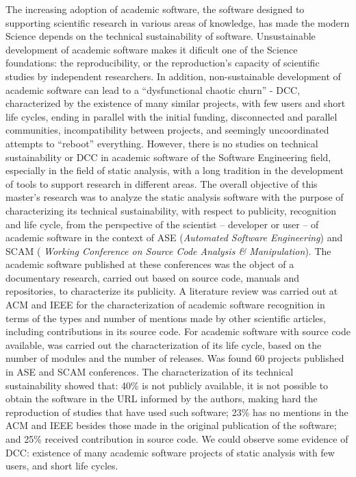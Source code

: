 The increasing adoption of academic software, the software designed to
supporting scientific research in various areas of knowledge, has made the
modern Science depends on the technical sustainability of software.
%
Unsustainable development of academic software makes it dificult one of the
Science foundations: the reproducibility, or the reproduction's capacity of
scientific studies by independent researchers.
%
In addition, non-sustainable development of academic software can lead to a
``dysfunctional chaotic churn'' - DCC, characterized by the existence of many
similar projects, with few users and short life cycles, ending in parallel with
the initial funding, disconnected and parallel communities, incompatibility
between projects, and seemingly uncoordinated attempts to ``reboot''
everything.
%
However, there is no studies on technical sustainability or DCC in academic
software of the Software Engineering field, especially in the field of static
analysis, with a long tradition in the development of tools to support research
in different areas.
%
The overall objective of this master's research was to analyze the static
analysis software with the purpose of characterizing its technical
sustainability, with respect to publicity, recognition and life cycle, from the
perspective of the scientist -- developer or user -- of academic software in
the context of ASE ({\it Automated Software Engineering}) and SCAM ({\it
Working Conference on Source Code Analysis \& Manipulation}).
%
The academic software published at these conferences was the object of a
documentary research, carried out based on source code, manuals and
repositories, to characterize its publicity.
%
A literature review was carried out at ACM and IEEE for the characterization of
academic software recognition in terms of the types and number of mentions made
by other scientific articles, including contributions in its source code.
%
For academic software with source code available, was carried out the
characterization of its life cycle, based on the number of modules and the
number of releases.
%
Was found 60 projects published in ASE and SCAM conferences.
%
The characterization of its technical sustainability showed that: 40\% is not
publicly available, it is not possible to obtain the software in the URL
informed by the authors, making hard the reproduction of studies that have used
such software;
%
23\% has no mentions in the ACM and IEEE besides those made in the original
publication of the software; and 25\% received contribution in source code.
%
We could observe some evidence of DCC: existence of many academic software
projects of static analysis with few users, and short life cycles.
